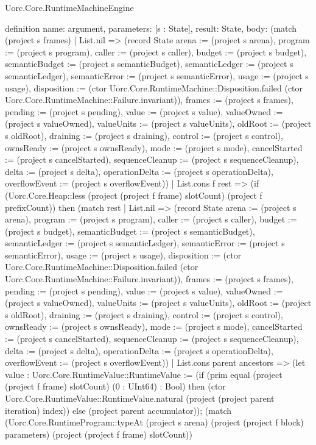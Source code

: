 \begin{lexlean}{Uorc.Core.RuntimeMachineEngine}
\begin{semanticmodule}
definition{
  name: argument,
  parameters: [s : State],
  result: State,
  body: (match (project s frames)
    | List.nil => (record State {arena := (project s arena), program := (project s program), caller := (project s caller), budget := (project s budget), semanticBudget := (project s semanticBudget), semanticLedger := (project s semanticLedger), semanticError := (project s semanticError), usage := (project s usage), disposition := (ctor Uorc.Core.RuntimeMachine::Disposition.failed (ctor Uorc.Core.RuntimeMachine::Failure.invariant)), frames := (project s frames), pending := (project s pending), value := (project s value), valueOwned := (project s valueOwned), valueUnits := (project s valueUnits), oldRoot := (project s oldRoot), draining := (project s draining), control := (project s control), ownsReady := (project s ownsReady), mode := (project s mode), cancelStarted := (project s cancelStarted), sequenceCleanup := (project s sequenceCleanup), delta := (project s delta), operationDelta := (project s operationDelta), overflowEvent := (project s overflowEvent)})
    | List.cons f rest => (if (Uorc.Core.Heap::less (project (project f frame) slotCount) (project f prefixCount)) then (match rest
      | List.nil => (record State {arena := (project s arena), program := (project s program), caller := (project s caller), budget := (project s budget), semanticBudget := (project s semanticBudget), semanticLedger := (project s semanticLedger), semanticError := (project s semanticError), usage := (project s usage), disposition := (ctor Uorc.Core.RuntimeMachine::Disposition.failed (ctor Uorc.Core.RuntimeMachine::Failure.invariant)), frames := (project s frames), pending := (project s pending), value := (project s value), valueOwned := (project s valueOwned), valueUnits := (project s valueUnits), oldRoot := (project s oldRoot), draining := (project s draining), control := (project s control), ownsReady := (project s ownsReady), mode := (project s mode), cancelStarted := (project s cancelStarted), sequenceCleanup := (project s sequenceCleanup), delta := (project s delta), operationDelta := (project s operationDelta), overflowEvent := (project s overflowEvent)})
      | List.cons parent ancestors => (let value : Uorc.Core.RuntimeValue::RuntimeValue := (if (prim equal (project (project f frame) slotCount) (0 : UInt64) : Bool) then (ctor Uorc.Core.RuntimeValue::RuntimeValue.natural (project (project parent iteration) index)) else (project parent accumulator)); (match (Uorc.Core.RuntimeProgram::typeAt (project s arena) (project (project f block) parameters) (project (project f frame) slotCount))
}
\end{semanticmodule}
\end{lexlean}
